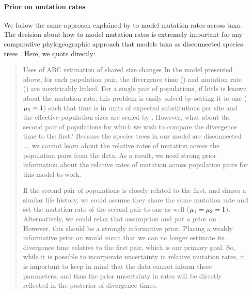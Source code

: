 \begin{linenomath}
\paragraph{Prior on mutation rates}
We follow the same approach explained by \citet{Oaks2018ecoevolity} to model
mutation rates across taxa.
The decision about how to model mutation rates is extremely important for any
comparative phylogeographic approach that models taxa as disconnected
species trees
\citep[\fig{}~\ref{fig:divCartoon}; e.g.,][]{Hickerson2006,Hickerson2007,Huang2011,Chan2014,Oaks2014dpp,Xue2015,Burbrink2016,Xue2017,Gehara2017,Oaks2018ecoevolity}.
Here, we quote \citet{Oaks2018ecoevolity} directly:
\begin{quotation}
Uses of ABC estimation of shared size changes \citep{Burbrink2016}
In the model presented above, for each population pair, the divergence time
(\divtime) and mutation rate (\murate) are inextricably linked.
For a single pair of populations, if little is known about the mutation rate,
this problem is easily solved by setting it to one ($\murate[1] = 1$) such
that time is in units of expected substitutions per site and the effective
population sizes are scaled by \murate.
However, what about the second pair of populations for which we wish to compare
the divergence time to the first?
Because the species trees in our model are disconnected
\ldots,
we cannot learn about
the relative rates of mutation across the population pairs from the data.
As a result, we need strong prior information about the relative rates of
mutation across population pairs for this model to work.

If the second pair of populations is closely related to the first, and shares a
similar life history, we could assume they share the same mutation rate and
set the mutation rate of the second pair to one as well ($\murate[1] = \murate[2] = 1$).
Alternatively, we could relax that assumption and put a prior on \murate[2].
However, this should be a strongly informative prior.
Placing a weakly informative prior on \murate[2] would mean that we can no
longer estimate its divergence time relative to the first pair,
which is our primary goal.
So, while it is possible to incorporate uncertainty in relative mutation rates,
it is important to keep in mind that the data cannot inform these parameters,
and thus the prior uncertainty in rates will be directly reflected in the
posterior of divergence times.
\end{quotation}


\end{linenomath}
